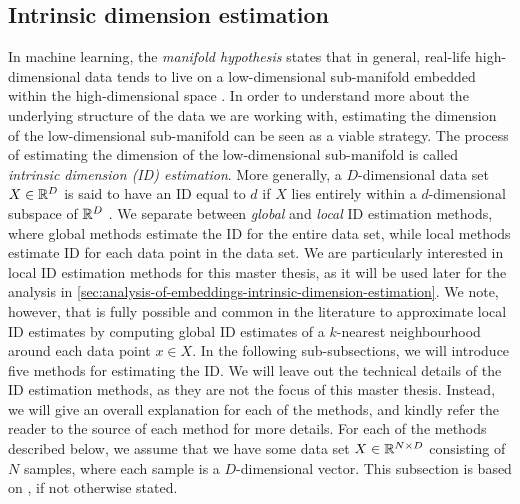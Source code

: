 \subsection{Intrinsic dimension estimation}
\label{sec:intrinsic-dimension-estimation}
In machine learning, the \textit{manifold hypothesis} states that in general, real-life high-dimensional data tends to live on a low-dimensional sub-manifold embedded within the high-dimensional space \cite[p. 16]{bengio2014representation}. In order to understand more about the underlying structure of the data we are working with, estimating the dimension of the low-dimensional sub-manifold can be seen as a viable strategy. The process of estimating the dimension of the low-dimensional sub-manifold is called \textit{intrinsic dimension (ID) estimation}. More generally, a $D$-dimensional data set $X \in \mathbb{R}^D$ is said to have an ID equal to $d$ if $X$ lies entirely within a $d$-dimensional subspace of $\mathbb{R}^D$ \cite{lee2015intrinsic}. We separate between \textit{global} and \textit{local} ID estimation methods, where global methods estimate the ID for the entire data set, while local methods estimate ID for each data point in the data set. We are particularly interested in local ID estimation methods for this master thesis, as it will be used later for the analysis  in \cref{sec:analysis-of-embeddings-intrinsic-dimension-estimation}. We note, however, that is fully possible and common in the literature to approximate local ID estimates by computing global ID estimates of a $k$-nearest neighbourhood around each data point $x \in X$. In the following sub-subsections, we will introduce five methods for estimating the ID. We will leave out the technical details of the ID estimation methods, as they are not the focus of this master thesis. Instead, we will give an overall explanation for each of the methods, and kindly refer the reader to the source of each method for more details. For each of the methods described below, we assume that we have some data set $X \in \mathbb{R}^{N \times D}$ consisting of $N$ samples, where each sample is a $D$-dimensional vector. This subsection is based on \cite{lee2015intrinsic}, if not otherwise stated.

